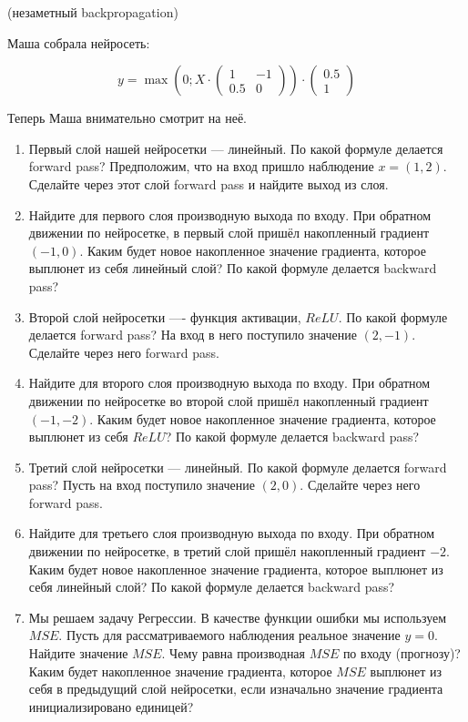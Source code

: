 \documentclass[12pt, a4paper, oneside]{article}
\theoremstyle{plain} %
\theoremstyle{definition}
\begin{document}
\begin{problem}{(незаметный backpropagation)}
	
	Маша собрала нейросеть: 
	
	\begin{equation*}
		y =   \max \left( 0;  X \cdot  \begin{pmatrix} 1 & -1 \\ 0.5 & 0 \end{pmatrix} \right) \cdot \begin{pmatrix} 0.5 \\ 1 \end{pmatrix} 
	\end{equation*}
	
	Теперь Маша внимательно смотрит на неё.
	
	\begin{enumerate}
		\item  Первый слой нашей нейросетки --- линейный. По какой формуле делается forward pass? Предположим, что на вход пришло наблюдение $x = (1, 2)$. Сделайте через этот слой forward pass и найдите выход из слоя.
		
		\item Найдите для первого слоя производную выхода по входу. При обратном движении по нейросетке, в первый слой пришёл накопленный градиент $(-1, 0)$. Каким будет новое накопленное значение градиента, которое выплюнет из себя линейный слой? По какой формуле делается backward pass? 
		
		\item Второй слой нейросетки ---- функция активации, $ReLU.$  По какой формуле делается forward pass? На вход в него поступило значение $(2, -1)$. Сделайте через него forward pass. 
		
		\item Найдите для второго слоя производную выхода по входу. При обратном движении по нейросетке во второй слой пришёл накопленный градиент $(-1, -2)$.  Каким будет новое накопленное значение градиента, которое выплюнет из себя $ReLU$?  По какой формуле делается backward pass? 
		
		\item Третий слой нейросетки --- линейный.  По какой формуле делается forward pass? Пусть на вход поступило значение $(2,0)$.  Сделайте через него forward pass. 
		
		\item Найдите для третьего слоя производную выхода по входу. При обратном движении по нейросетке, в третий слой пришёл накопленный градиент $-2$. Каким будет новое накопленное значение градиента, которое выплюнет из себя линейный слой?  По какой формуле делается backward pass? 
		\item Мы решаем задачу Регрессии. В качестве функции ошибки мы используем $MSE$. Пусть для рассматриваемого наблюдения реальное значение $y = 0$. Найдите значение $MSE$. Чему равна производная $MSE$ по входу (прогнозу)? Каким будет накопленное значение градиента, которое $MSE$ выплюнет из себя в предыдущий слой нейросетки, если изначально значение градиента инициализировано единицей? 
		

\end{enumerate}
\end{problem}
\end{document}
